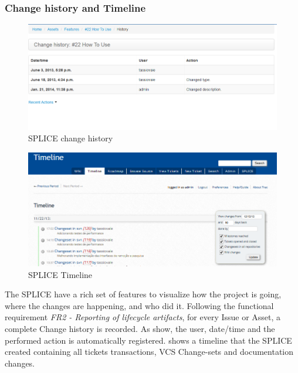 \subsubsection{Change history and Timeline}
\begin{figure}[htp]
\begin{center}
  \includegraphics[width=16cm]{chapters/proposed_solution/img/captures/changestory.PNG}
  \caption[SPLICE Change history]{SPLICE change history}
  \label{fg:splice-change-history}
\end{center}
\end{figure}

\begin{figure}[htp]
\begin{center}
  \includegraphics[width=16cm]{chapters/proposed_solution/img/captures/splice-timeline.PNG}
  \caption[SPLICE Timeline]{SPLICE Timeline }
  \label{fg:splice-timeline}
\end{center}
\end{figure}


The \ac{SPLICE} have a rich set of features to visualize how the project is going, where the changes are happening, and who did it. Following the functional requirement \textit{FR2 - Reporting of lifecycle artifacts}, for every Issue or Asset, a complete Change history is recorded. As  show, the user, date/time and the performed action is automatically registered.
 shows a timeline that the \ac{SPLICE} created containing all tickets transactions, \ac{VCS} Change-sets and documentation changes. 


